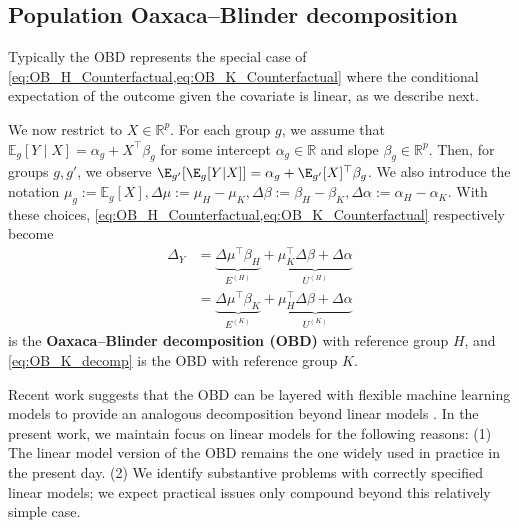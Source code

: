 \subsection{Population Oaxaca--Blinder decomposition} 
\label{sec:ob}

Typically the OBD represents the special case of \cref{eq:OB_H_Counterfactual,eq:OB_K_Counterfactual} 
where the conditional expectation of the outcome given the covariate is linear, as we describe next.

We now restrict to $X \in \mathbb{R}^p$. For each group $g$, we assume that $\mathbb{E}_g[Y \mid X] = \alpha_g + X^\top \beta_g$
for some intercept $\alpha_g \in \mathbb{R}$ and slope $\beta_g \in \mathbb{R}^p$.
Then, for groups $g,g'$, we observe $\E_{g'} [ \E_g  [ Y | X ] ] = \alpha_g + \E_{g'}[X]^\top \beta_g$.
We also introduce the notation
$\mu_g := \mathbb{E}_g[X],
\Delta \mu := \mu_H - \mu_K,
\Delta \beta := \beta_H - \beta_K,
\Delta \alpha := \alpha_H - \alpha_K.
$
With these choices,
\cref{eq:OB_H_Counterfactual,eq:OB_K_Counterfactual} respectively become
\begin{align}
    \label{eq:OB_H_decomp}
	\Delta_Y &= \underbrace{\Delta \mu^\top \beta_H}_{E^{(H)}} + \underbrace{\mu_K^\top \Delta \beta + \Delta \alpha}_{U^{(H)}} \\
    \label{eq:OB_K_decomp}
	&= \underbrace{\Delta \mu^\top \beta_K}_{E^{(K)}} + \underbrace{\mu_H^\top \Delta \beta + \Delta \alpha}_{U^{(K)}}
\end{align}
 is the \textbf{Oaxaca--Blinder decomposition (OBD)} with reference group $H$, and \cref{eq:OB_K_decomp}
is the OBD with reference group $K$.

Recent work suggests that the OBD can be layered with flexible machine learning models to provide 
an analogous decomposition beyond linear models \citep{bach2024heterogeneity,quintas2024multiply,quintero2025}. In the present work, we maintain focus on linear models for the following reasons:
(1) The linear model version of the OBD remains the one widely used in practice in the present day.
(2) We identify substantive problems with correctly specified linear models; we expect practical issues only compound beyond this relatively simple case.


